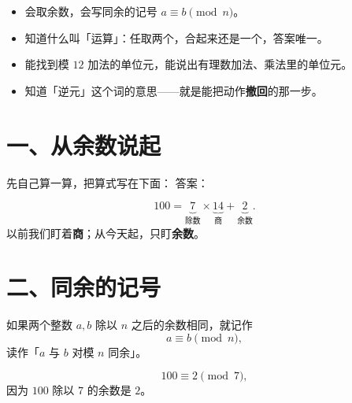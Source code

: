 


\begin{mubiao}
  \begin{itemize}
    \item 会取余数，会写同余的记号 \(a\equiv b\pmod n\)。
    \item 知道什么叫「运算」：任取两个，合起来还是一个，答案唯一。
    \item 能找到模 \(12\) 加法的单位元，能说出有理数加法、乘法里的单位元。
    \item 知道「逆元」这个词的意思——就是能把动作\textbf{撤回}的那一步。
  \end{itemize}
\end{mubiao}

\section*{一、从余数说起}

\begin{sikao}
  先自己算一算，把算式写在下面：
  答案：\underline{\hspace{5em}}
\end{sikao}

\begin{example}
  \[
    100 = \underbrace{7}_{\text{除数}}\times\underbrace{14}_{\text{商}}+\underbrace{2}_{\text{余数}} .
  \]
  以前我们盯着\textbf{商}；从今天起，只盯\textbf{余数}。
\end{example}

\section*{二、同余的记号}

\begin{definition}[同余]
  如果两个整数 \(a,b\) 除以 \(n\) 之后的余数相同，就记作
  \[
    a\equiv b \pmod n,
  \]
  读作「\(a\) 与 \(b\) 对模 \(n\) 同余」。
\end{definition}

\begin{example}
  \[
    100\equiv2 \pmod 7,
  \]
  因为 \(100\) 除以 \(7\) 的余数是 \(2\)。
\end{example}


